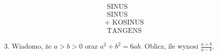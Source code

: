 \documentclass[10pt]{article}
\begin{document}
\[
\begin{array}{r}
\text { SINUS } \\
\text { SINUS } \\
+ \text { KOSINUS } \\
\hline \text { TANGENS }
\end{array}
\]

\begin{enumerate}
  \setcounter{enumi}{2}
  \item Wiadomo, że \(a>b>0\) oraz \(a^{2}+b^{2}=6 a b\). Oblicz, ile wynosi \(\frac{a+b}{a-b}\).
\end{enumerate}
\end{document}
